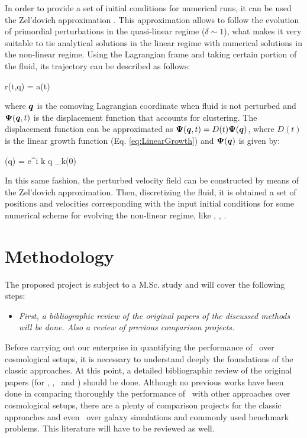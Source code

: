 \documentclass[a4,useAMS,usenatbib,usegraphicx,12pt]{article}
\begin{document}
In order to provide a set of initial conditions for numerical runs, it can be 
used the Zel'dovich approximation \citep{Zeldovich70}. This approximation allows
to follow the evolution of primordial perturbations in the quasi-linear regime 
($\delta \sim 1$), what makes it very suitable to tie analytical solutions in 
the linear regime with numerical solutions in the non-linear regime. Using the
Lagrangian frame and taking certain portion of the fluid, its trajectory can 
be described as follows:

{ \bds r(t,\bds q) = a(t) }

where $\boldsymbol{ q }$ is the comoving Lagrangian coordinate when fluid is not 
perturbed and $\boldsymbol{ \Psi }(\boldsymbol{ q }, t)$ is the displacement function that 
accounts for clustering. The displacement function can be approximated as 
$\boldsymbol{ \Psi }(\boldsymbol{ q }, t) = D(t)\boldsymbol{ \Psi }(\boldsymbol{ q })$, where $D(t)$ is the linear 
growth function (Eq. \ref{eq:LinearGrowth}) and $\boldsymbol{ \Psi }(\boldsymbol{ q })$ is given 
by:

{ \bds{\Psi}(\bds q) = \int {}e^{i \bds k \cdot \bds q}
\delta_{\bds k}(0) }

In this same fashion, the perturbed velocity field can be constructed by means
of the Zel'dovich approximation. Then, discretizing the fluid, it is obtained a 
set of positions and velocities corresponding with the input initial conditions 
for some numerical scheme for evolving the non-linear regime, like \SPH, \VPH, 
\AMR.

\section{Methodology}
The proposed project is subject to a M.Sc. study and will cover the following 
steps:


\begin{itemize}
\item[\checkmark] \textit{First, a bibliographic review of the original papers 
of the discussed methods will be done. Also a review of previous comparison 
projects.}
\end{itemize}


Before carrying out our enterprise in quantifying the performance of \VPH\ over
cosmological setups, it is necessary to understand deeply the foundations of 
the classic approaches. At this point, a detailed bibliographic review of the 
original papers (for \SPH, \AMR, \VPH\ and \AREPO) should be done. Although no 
previous works have been done in comparing thoroughly the performance of \VPH\
with other approaches over cosmological setups, there are a plenty of comparison
projects for the classic approaches and even \AREPO\ over galaxy simulations and 
commonly used benchmark problems. This literature will have to be reviewed as 
well.
\end{document}
